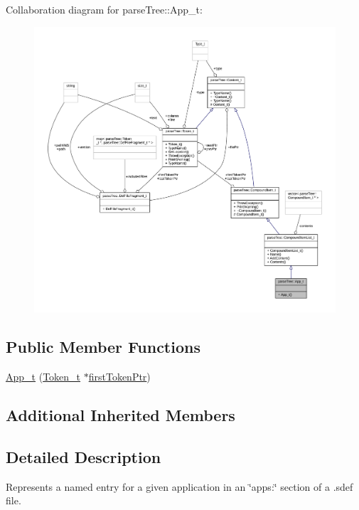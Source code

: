 Collaboration diagram for parse\+Tree\+:\+:App\+\_\+t\+:
\nopagebreak
\begin{figure}[H]
\begin{center}
\leavevmode
\includegraphics[width=350pt]{structparse_tree_1_1_app__t__coll__graph}
\end{center}
\end{figure}
\subsection*{Public Member Functions}
\begin{DoxyCompactItemize}
\item 
\hyperlink{structparse_tree_1_1_app__t_a63ce6fd0e682c5973e0475f48398d625}{App\+\_\+t} (\hyperlink{structparse_tree_1_1_token__t}{Token\+\_\+t} $\ast$\hyperlink{structparse_tree_1_1_compound_item__t_a587020c943e760cb0152dd8cd31e21ef}{first\+Token\+Ptr})
\end{DoxyCompactItemize}
\subsection*{Additional Inherited Members}


\subsection{Detailed Description}
Represents a named entry for a given application in an \char`\"{}apps\+:\char`\"{} section of a .sdef file. 

